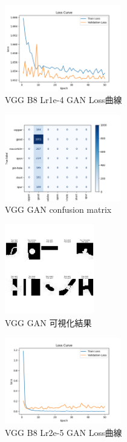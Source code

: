 \begin{figure}[H]
    \centering
    \includegraphics[width=0.45\textwidth]{./img/VGG/P5.png}
    \caption{VGG B8 Lr1e-4 GAN Loss曲線}
    \label{fig:VGG_P5}
\end{figure}
\begin{figure}[H]
    \centering
    \includegraphics[width=0.45\textwidth]{./img/VGG/P6.png}
    \caption{VGG GAN confusion matrix}
    \label{fig:VGG_P6}
\end{figure}
\begin{figure}[H]
    \centering
    \includegraphics[width=0.35\textwidth]{./img/VGG/P7.png}
    \caption{VGG GAN 可視化結果} 
    \label{fig:VGG_P7}
\end{figure}
\begin{figure}[H]
    \centering
    \includegraphics[width=0.45\textwidth]{./img/VGG/P8.png}
    \caption{VGG B8 Lr2e-5 GAN Loss曲線}
    \label{fig:VGG_P8}
\end{figure}
